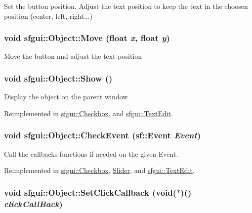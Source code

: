 Set the button position. Adjust the text position to keep the text in the choosen position (center, left, right...) \hypertarget{classsfgui_1_1Object_70b15fba99da515808d3da7d8042f458}{
\subsubsection[Move]{\setlength{\rightskip}{0pt plus 5cm}void sfgui::Object::Move (float {\em x}, \/  float {\em y})}}
\label{classsfgui_1_1Object_70b15fba99da515808d3da7d8042f458}




Move the button and adjust the text position \hypertarget{classsfgui_1_1Object_cdf7f9b5f731e49e0e13e55de704805d}{
\subsubsection[Show]{\setlength{\rightskip}{0pt plus 5cm}void sfgui::Object::Show ()}}
\label{classsfgui_1_1Object_cdf7f9b5f731e49e0e13e55de704805d}




Display the object on the parent window 

Reimplemented in \hyperlink{classsfgui_1_1Checkbox_0028c58d4579845c1bdf3cae7ec9af5a}{sfgui::Checkbox}, and \hyperlink{classsfgui_1_1TextEdit_1ee03247816213b34caaff365b160de0}{sfgui::TextEdit}.\hypertarget{classsfgui_1_1Object_cd9dbf2abe79e04c22f281bccb8bdb0e}{
\subsubsection[CheckEvent]{\setlength{\rightskip}{0pt plus 5cm}void sfgui::Object::CheckEvent (sf::Event {\em Event})}}
\label{classsfgui_1_1Object_cd9dbf2abe79e04c22f281bccb8bdb0e}




Call the callbacks functions if needed on the given Event. 

Reimplemented in \hyperlink{classsfgui_1_1Checkbox_d618a9010bef60b8ea2f11f893320fb8}{sfgui::Checkbox}, \hyperlink{classSlider_29b1b660a47bd4c2e2baaedf02a072c3}{Slider}, and \hyperlink{classsfgui_1_1TextEdit_af6d4be3633d3eb8bcc7a1007e324da8}{sfgui::TextEdit}.\hypertarget{classsfgui_1_1Object_d3d20a4cccde599748db724236ca0826}{
\subsubsection[SetClickCallback]{\setlength{\rightskip}{0pt plus 5cm}void sfgui::Object::SetClickCallback (void($\ast$)() {\em clickCallBack})}}
\label{classsfgui_1_1Object_d3d20a4cccde599748db724236ca0826}




